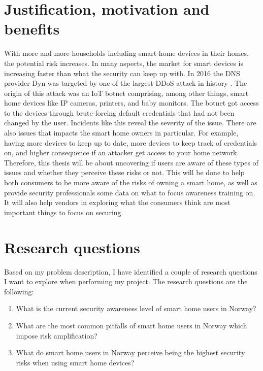\section{Justification, motivation and benefits}
With more and more households including smart home devices in their homes, the potential risk increases. In many aspects, the market for smart devices is increasing faster than what the security can keep up with. In 2016 the DNS provider Dyn was targeted by one of the largest DDoS attack in history \cite{wiki:Dyn}. The origin of this attack was an IoT botnet comprising, among other things, smart home devices like IP cameras, printers, and baby monitors. The botnet got access to the devices through brute-forcing default credentials that had not been changed by the user. Incidents like this reveal the severity of the issue. There are also issues that impacts the smart home owners in particular. For example, having more devices to keep up to date, more devices to keep track of credentials on, and higher consequence if an attacker get access to your home network. Therefore, this thesis will be about uncovering if users are aware of these types of issues and whether they perceive these risks or not. This will be done to help both consumers to be more aware of the risks of owning a smart home, as well as provide security professionals some data on what to focus awareness training on. It will also help vendors in exploring what the consumers think are most important things to focus on securing. 

\section{Research questions}
\label{research:questions}
Based on my problem description, I have identified a couple of research questions I want to explore when performing my project. The research questions are the following: 
\begin{enumerate}
    \item What is the current security awareness level of smart home users in Norway?
    \item What are the most common pitfalls of smart home users in Norway which impose risk amplification?
    \item What do smart home users in Norway perceive being the highest security risks when using smart home devices?
\end{enumerate}

